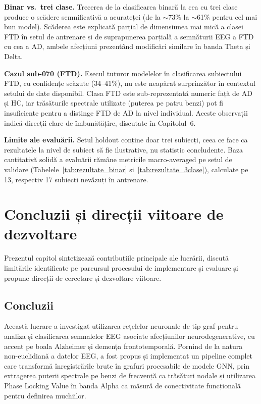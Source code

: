 \documentclass[12pt,a4paper]{report}
\theoremstyle{definition}
\theoremstyle{remark}
\begin{document}
\textbf{Binar vs.\ trei clase.} Trecerea de la clasificarea binară la cea cu trei clase
produce o scădere semnificativă a acurateței (de la $\sim$73\% la $\sim$61\% pentru cel
mai bun model). Scăderea este explicată parțial de dimensiunea mai mică a clasei FTD
în setul de antrenare și de suprapunerea parțială a semnăturii EEG a FTD cu cea a AD,
ambele afecțiuni prezentând modificări similare în banda Theta și Delta.

\textbf{Cazul sub-070 (FTD).} Eșecul tuturor modelelor în clasificarea subiectului
FTD, cu confidențe scăzute (34--41\%), nu este neapărat surprinzător în contextul
setului de date disponibil. Clasa FTD este sub-reprezentată numeric față de AD și HC,
iar trăsăturile spectrale utilizate (puterea pe patru benzi) pot fi insuficiente pentru
a distinge FTD de AD la nivel individual. Aceste observații indică direcții clare de
îmbunătățire, discutate în Capitolul~6.

\textbf{Limite ale evaluării.} Setul holdout conține doar trei subiecți, ceea ce face
ca rezultatele la nivel de subiect să fie ilustrative, nu statistic concludente.
Baza cantitativă solidă a evaluării rămâne metricile macro-averaged pe setul de
validare (Tabelele~\ref{tab:rezultate_binar} și~\ref{tab:rezultate_3clase}), calculate
pe 13, respectiv 17 subiecți nevăzuți în antrenare.

\chapter{Concluzii și direcții viitoare de dezvoltare}

Prezentul capitol sintetizează contribuțiile principale ale lucrării, discută
limitările identificate pe parcursul procesului de implementare și evaluare și
propune direcții de cercetare și dezvoltare viitoare.

\section{Concluzii}

Această lucrare a investigat utilizarea rețelelor neuronale de tip graf pentru
analiza și clasificarea semnalelor EEG asociate afecțiunilor neurodegenerative,
cu accent pe boala Alzheimer și demența frontotemporală. Pornind de la natura
non-euclidiană a datelor EEG, a fost propus și implementat un pipeline complet
care transformă înregistrările brute în grafuri procesabile de modele GNN, prin
extragerea puterii spectrale pe benzi de frecvență ca trăsături nodale și
utilizarea Phase Locking Value în banda Alpha ca măsură de conectivitate funcțională
pentru definirea muchiilor.
\end{document}
